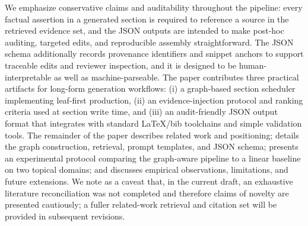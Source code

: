 We emphasize conservative claims and auditability throughout the pipeline: every factual assertion in a generated section is required to reference a source in the retrieved evidence set, and the JSON outputs are intended to make post-hoc auditing, targeted edits, and reproducible assembly straightforward.
The JSON schema additionally records provenance identifiers and snippet anchors to support traceable edits and reviewer inspection, and it is designed to be human-interpretable as well as machine-parseable.
The paper contributes three practical artifacts for long-form generation workflows: (i) a graph-based section scheduler implementing leaf-first production, (ii) an evidence-injection protocol and ranking criteria used at section write time, and (iii) an audit-friendly JSON output format that integrates with standard LaTeX/bib toolchains and simple validation tools.
The remainder of the paper describes related work and positioning; details the graph construction, retrieval, prompt templates, and JSON schema; presents an experimental protocol comparing the graph-aware pipeline to a linear baseline on two topical domains; and discusses empirical observations, limitations, and future extensions.
We note as a caveat that, in the current draft, an exhaustive literature reconciliation was not completed and therefore claims of novelty are presented cautiously; a fuller related-work retrieval and citation set will be provided in subsequent revisions.